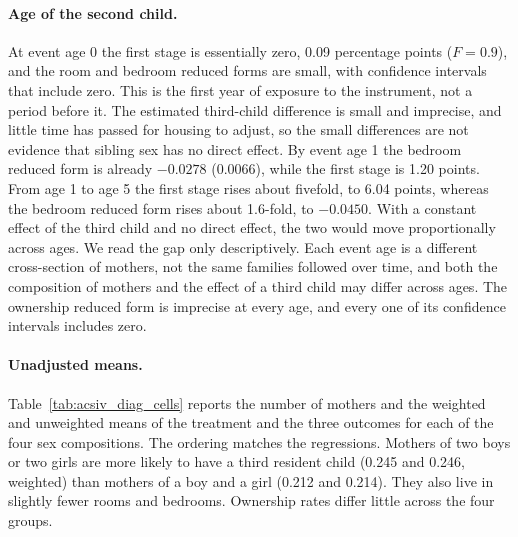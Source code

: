 \paragraph{Age of the second child.}
At event age 0 the first stage is essentially zero, 0.09 percentage points
($F=0.9$), and the room and bedroom reduced forms are small, with confidence
intervals that include zero. This is the first year of exposure to the instrument,
not a period before it. The estimated third-child difference is small and imprecise,
and little time has passed for housing to adjust, so the small differences are not evidence
that sibling sex has no direct effect. By event age 1 the bedroom reduced form is already $-0.0278$
(0.0066), while the first stage is 1.20 points. From age 1 to age 5 the first stage
rises about fivefold, to 6.04 points, whereas the bedroom reduced form rises about
1.6-fold, to $-0.0450$. With a constant effect of the third child and no direct
effect, the two would move proportionally across ages. We read the gap only
descriptively. Each event age is a different cross-section of mothers, not the
same families followed over time, and both the composition of mothers and the
effect of a third child may differ across ages. The ownership reduced form is
imprecise at every age, and every one of its confidence intervals includes zero.

\paragraph{Unadjusted means.}
Table~\ref{tab:acsiv_diag_cells} reports the number of mothers and the weighted and
unweighted means of the treatment and the three outcomes for each of the four sex
compositions. The ordering matches the regressions. Mothers of two boys or two
girls are more likely to have a third resident child (0.245 and 0.246, weighted)
than mothers of a boy and a girl (0.212 and 0.214). They also live in slightly
fewer rooms and bedrooms. Ownership rates differ little across the four groups.

